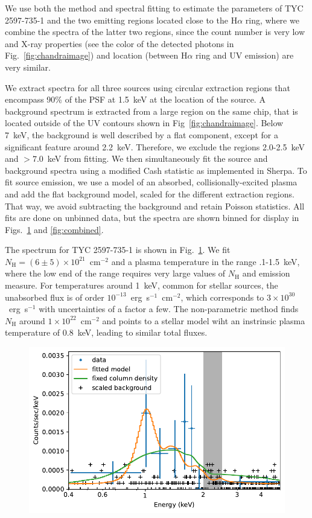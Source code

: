 \documentclass[linenumbers]{aastex631}
\begin{document}
We use both the \citet{2010ApJ...708.1760G} method and spectral fitting to estimate the parameters of TYC 2597-735-1 and the two emitting regions located close to the H$\alpha$ ring, where we combine the spectra of the latter two regions, since the count number is very low and X-ray properties (see the color of the detected photons in Fig.~\ref{fig:chandraimage}) and location (between H$\alpha$ ring and UV emission) are very similar.

We extract spectra for all three sources using circular extraction regions that encompass 90\% of the PSF at 1.5~keV at the location of the source. A background spectrum is extracted from a large region on the same chip, that is located outside of the UV contours shown in Fig~\ref{fig:chandraimage}. Below 7~keV, the background is well described by a flat component, except for a significant feature around 2.2~keV. Therefore, we exclude the regions 2.0-2.5~keV and $>7.0$~keV from fitting. We then simultaneously fit the source and background spectra using a modified Cash statistic \citep{1979ApJ...228..939C} as implemented in Sherpa\citep{2007ASPC..376..543D,doug_burke_2021_4428938}. To fit source emission, we use a model of an absorbed, collisionally-excited plasma \citep[APEC model][]{2012ApJ...756..128F} and add the flat background model, scaled for the different extraction regions. That way, we avoid subtracting the background and retain Poisson statistics. All fits are done on unbinned data, but the spectra are shown binned for display in Figs.~\ref{fig:TYC_spec} and \ref{fig:combined}.

The spectrum for TYC 2597-735-1 is shown in Fig.~\ref{fig:TYC_spec}. We fit $N_\mathrm{H}=(6\pm5)\times10^{21}$~cm$^{-2}$ and a plasma temperature in the range .1-1.5~keV, where the low end of the range requires very large values of $N_\mathrm{H}$ and emission measure. For temperatures around 1~keV, common for stellar sources, the unabsorbed flux is of order $10^{-13}$~erg~s$^{-1}$~cm$^{-2}$, which corresponds to $3\times 10^{30}$~erg~s$^{-1}$ with uncertainties of a factor a few. The non-parametric method finds $N_\mathrm{H}$ around $1\times10^{22}$~cm$^{-2}$ and points to a stellar model wiht an instrinsic plasma temperature of 0.8~keV, leading to similar total fluxes.
\begin{figure}
    \centering
    \includegraphics[width=\textwidth]{figures/TYC_spec.pdf}
    \caption{}
    \label{fig:TYC_spec}
\end{figure}
\end{document}
